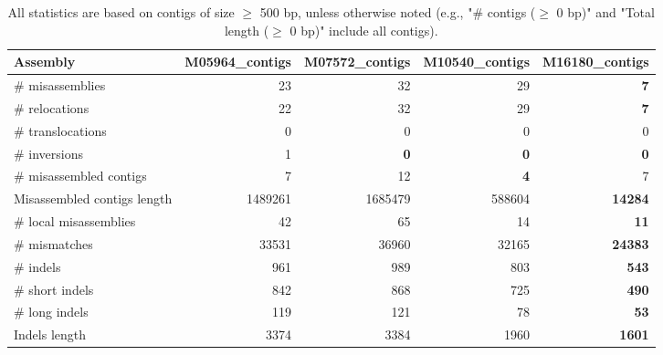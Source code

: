 \documentclass[12pt,a4paper]{article}
\begin{document}
\begin{table}[ht]
\begin{center}
\caption{All statistics are based on contigs of size $\geq$ 500 bp, unless otherwise noted (e.g., "\# contigs ($\geq$ 0 bp)" and "Total length ($\geq$ 0 bp)" include all contigs).}
\begin{tabular}{|l*{4}{|r}|}
\hline
Assembly & M05964\_contigs & M07572\_contigs & M10540\_contigs & M16180\_contigs \\ \hline
\# misassemblies & 23 & 32 & 29 & {\bf 7} \\ \hline
\hspace{5mm}\# relocations & 22 & 32 & 29 & {\bf 7} \\ \hline
\hspace{5mm}\# translocations & 0 & 0 & 0 & 0 \\ \hline
\hspace{5mm}\# inversions & 1 & {\bf 0} & {\bf 0} & {\bf 0} \\ \hline
\# misassembled contigs & 7 & 12 & {\bf 4} & 7 \\ \hline
Misassembled contigs length & 1489261 & 1685479 & 588604 & {\bf 14284} \\ \hline
\# local misassemblies & 42 & 65 & 14 & {\bf 11} \\ \hline
\# mismatches & 33531 & 36960 & 32165 & {\bf 24383} \\ \hline
\# indels & 961 & 989 & 803 & {\bf 543} \\ \hline
\hspace{5mm}\# short indels & 842 & 868 & 725 & {\bf 490} \\ \hline
\hspace{5mm}\# long indels & 119 & 121 & 78 & {\bf 53} \\ \hline
Indels length & 3374 & 3384 & 1960 & {\bf 1601} \\ \hline
\end{tabular}
\end{center}
\end{table}
\end{document}
